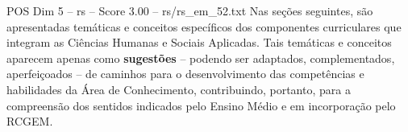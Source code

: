 \begin{textsample}{POS Dim 5 – rs – Score 3.00 – rs/rs\_em\_52.txt}
Nas seções seguintes, são apresentadas temáticas e conceitos específicos dos componentes curriculares que integram as Ciências Humanas e Sociais Aplicadas.
Tais temáticas e conceitos aparecem apenas como \textbf{sugestões} – podendo ser adaptados, complementados, aperfeiçoados – de caminhos para o desenvolvimento das competências e habilidades da Área de Conhecimento, contribuindo, portanto, para a compreensão dos sentidos indicados pelo Ensino Médio e em incorporação pelo RCGEM.

\end{textsample}
